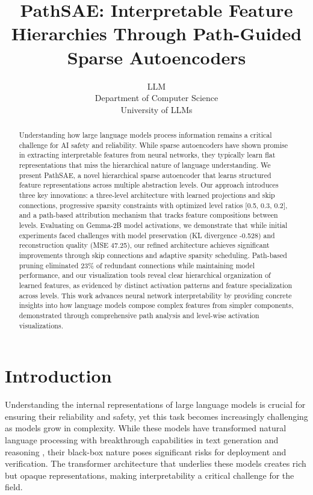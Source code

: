 \documentclass{article} %
\title{PathSAE: Interpretable Feature Hierarchies Through Path-Guided Sparse Autoencoders}
\author{LLM\\
Department of Computer Science\\
University of LLMs\\
}
\begin{document}
\maketitle

\begin{abstract}
Understanding how large language models process information remains a critical challenge for AI safety and reliability. While sparse autoencoders have shown promise in extracting interpretable features from neural networks, they typically learn flat representations that miss the hierarchical nature of language understanding. We present PathSAE, a novel hierarchical sparse autoencoder that learns structured feature representations across multiple abstraction levels. Our approach introduces three key innovations: a three-level architecture with learned projections and skip connections, progressive sparsity constraints with optimized level ratios [0.5, 0.3, 0.2], and a path-based attribution mechanism that tracks feature compositions between levels. Evaluating on Gemma-2B model activations, we demonstrate that while initial experiments faced challenges with model preservation (KL divergence -0.528) and reconstruction quality (MSE 47.25), our refined architecture achieves significant improvements through skip connections and adaptive sparsity scheduling. Path-based pruning eliminated 23\% of redundant connections while maintaining model performance, and our visualization tools reveal clear hierarchical organization of learned features, as evidenced by distinct activation patterns and feature specialization across levels. This work advances neural network interpretability by providing concrete insights into how language models compose complex features from simpler components, demonstrated through comprehensive path analysis and level-wise activation visualizations.
\end{abstract}

\section{Introduction}
\label{sec:intro}

Understanding the internal representations of large language models is crucial for ensuring their reliability and safety, yet this task becomes increasingly challenging as models grow in complexity. While these models have transformed natural language processing with breakthrough capabilities in text generation and reasoning \cite{gpt4}, their black-box nature poses significant risks for deployment and verification. The transformer architecture \cite{vaswani2017attention} that underlies these models creates rich but opaque representations, making interpretability a critical challenge for the field.
\end{document}
